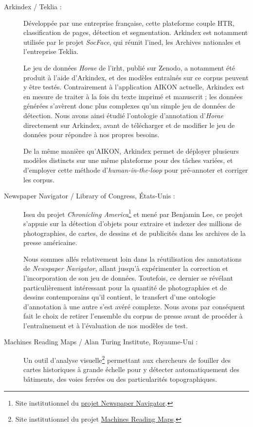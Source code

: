 \begin{description}
		\item[Arkindex / Teklia :] Développée par une entreprise française, cette plateforme couple HTR, classification de pages, détection et segmentation. Arkindex est notamment utilisée par le projet \textit{SocFace}, qui réunit l'\gls{ined}, les Archives nationales et l'entreprise Teklia.

		Le jeu de données \textit{Horae} de l'\gls{irht}, publié sur Zenodo, a notamment été produit à l'aide d'Arkindex, et des modèles entraînés sur ce corpus peuvent y être testés. Contrairement à l'application AIKON actuelle, Arkindex est en mesure de traiter à la fois du texte imprimé et manuscrit ; les données générées s'avèrent donc plus complexes qu'un simple jeu de données de détection. Nous avons ainsi étudié l'ontologie d'annotation d'\textit{Horae} directement sur Arkindex, avant de télécharger et de modifier le jeu de données pour répondre à nos propres besoins.

		De la même manière qu'AIKON, Arkindex permet de déployer plusieurs modèles distincts sur une même plateforme pour des tâches variées, et d'employer cette méthode d'\textit{human-in-the-loop} pour pré-annoter et corriger les corpus.
        
        \item[Newspaper Navigator / Library of Congress, États-Unis :] Issu du projet \textit{Chronicling America}\footnote{Site institutionnel du \href{https://labs.loc.gov/work/experiments/newspaper-navigator/}{projet Newspaper Navigator}.} et mené par Benjamin Lee, ce projet s'appuie sur la détection d'objets pour extraire et indexer des millions de photographies, de cartes, de dessins et de publicités dans les archives de la presse américaine.
        
        Nous sommes allés relativement loin dans la réutilisation des annotations de \textit{Newspaper Navigator}, allant jusqu'à expérimenter la correction et l'incorporation de son jeu de données. Toutefois, ce dernier se révélant particulièrement intéressant pour la quantité de photographies et de dessins contemporains qu'il contient, le transfert d'une ontologie d'annotation à une autre s'est avéré complexe. Nous avons par conséquent fait le choix de retirer l'ensemble du corpus de presse avant de procéder à l'entraînement et à l'évaluation de nos modèles de test.
        
        \item[Machines Reading Maps / Alan Turing Institute, Royaume-Uni :] Un outil d'analyse visuelle\footnote{Site institutionnel du projet \href{https://www.turing.ac.uk/research/research-projects/machines-reading-maps}{Machines Reading Maps}.} permettant aux chercheurs de fouiller des cartes historiques à grande échelle pour y détecter automatiquement des bâtiments, des voies ferrées ou des particularités topographiques.
        

\end{description}
